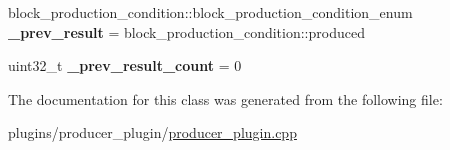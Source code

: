 \begin{DoxyCompactItemize}
\item 
\mbox{\label{classaacio_1_1producer__plugin__impl_a7f61b52f676246ad1c4b03201e5b8b2f}} 
block\+\_\+production\+\_\+condition\+::block\+\_\+production\+\_\+condition\+\_\+enum {\bfseries \+\_\+prev\+\_\+result} = block\+\_\+production\+\_\+condition\+::produced
\item 
\mbox{\label{classaacio_1_1producer__plugin__impl_a6b83be56b7e165b16cc9f304102e7826}} 
uint32\+\_\+t {\bfseries \+\_\+prev\+\_\+result\+\_\+count} = 0
\end{DoxyCompactItemize}


The documentation for this class was generated from the following file\+:\begin{DoxyCompactItemize}
\item 
plugins/producer\+\_\+plugin/\mbox{\hyperlink{producer__plugin_8cpp}{producer\+\_\+plugin.\+cpp}}\end{DoxyCompactItemize}
